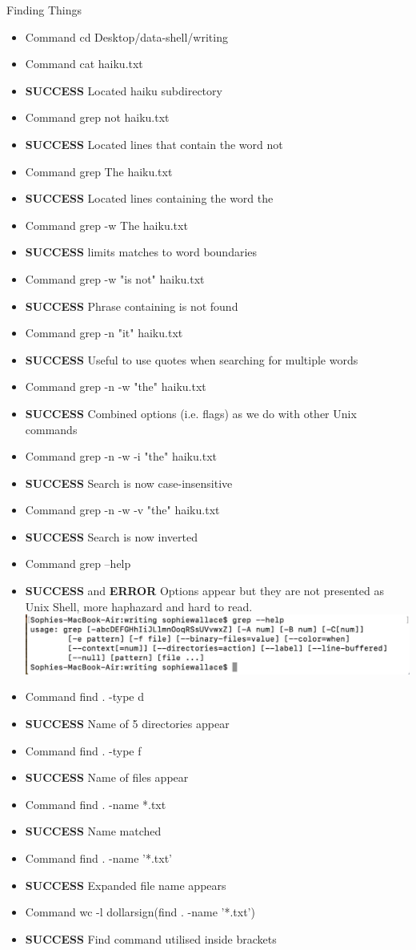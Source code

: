 \documentclass{article}
\begin{document}
Finding Things 
\begin{itemize}
\item Command cd Desktop/data-shell/writing
\item Command cat haiku.txt
\item \textbf{SUCCESS} Located haiku subdirectory
\item Command  grep not haiku.txt
\item \textbf{SUCCESS} Located lines that contain the word not
\item Command grep The haiku.txt
\item \textbf{SUCCESS} Located lines containing the word the
\item Command grep -w The haiku.txt
\item \textbf{SUCCESS} limits matches to word boundaries
\item Command grep -w "is not" haiku.txt
\item \textbf{SUCCESS} Phrase containing is not found
\item Command grep -n "it" haiku.txt
\item \textbf{SUCCESS} Useful to use quotes when searching for multiple words
\item Command grep -n -w "the" haiku.txt
\item \textbf{SUCCESS} Combined options (i.e. flags) as we do with other Unix commands
\item Command grep -n -w -i "the" haiku.txt
\item \textbf{SUCCESS} Search is now case-insensitive
\item Command grep -n -w -v "the" haiku.txt
\item \textbf{SUCCESS} Search is now inverted
\item Command grep --help
\item \textbf{SUCCESS} and \textbf{ERROR} Options appear but they are not presented as Unix Shell, more haphazard and hard to read. \\

\includegraphics[width=\textwidth]{Images/grep--help.png} \\
\item Command find . -type d
\item \textbf{SUCCESS} Name of 5 directories appear
\item Command find . -type f
\item \textbf{SUCCESS} Name of files appear 
\item Command find . -name *.txt
\item \textbf{SUCCESS} Name matched
\item Command  find . -name '*.txt'
\item \textbf{SUCCESS} Expanded file name appears
\item Command wc -l dollarsign(find . -name '*.txt')
\item \textbf{SUCCESS} Find command utilised inside brackets
\end{itemize}
\end{document}
